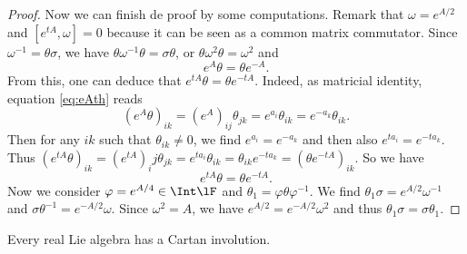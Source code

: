 \begin{proof}
	Now we can finish de proof by some computations. Remark that $\omega=e^{A/2}$ and $[e^{tA},\omega]=0$ because it can be seen as a common matrix commutator. Since $\omega^{-1}=\theta\sigma$, we have $\theta\omega^{-1}\theta=\sigma\theta$, or $\theta\omega^2\theta=\omega^2$ and
	\begin{equation}\label{eq:eAth}
		e^{A}\theta=\theta e^{-A}.
	\end{equation}
	From this, one can deduce that $e^{tA}\theta=\theta e^{-tA}$. Indeed, as matricial identity, equation \eqref{eq:eAth} reads
	\[
		(e^{A}\theta)_{ik}=(e^{A})_{ij}\theta_{jk}
		=e^{a_i}\theta_{ik}
		=e^{-a_k}\theta_{ik}.
	\]
	Then for any $ik$ such that $\theta_{ik}\neq 0$, we find $e^{a_i}=e^{-a_k}$ and then also $e^{ta_i}=e^{-ta_k}$. Thus $(e^{tA}\theta)_{ik}=(e^{tA})_ij\theta_{jk}=e^{ta_i}\theta_{ik}=\theta_{ik}e^{-ta_k}=(\theta e^{-tA})_{ik}$. So we have
	\begin{equation}
		e^{tA}\theta=\theta e^{-tA}.
	\end{equation}
	Now we consider $\varphi=e^{A/4}\in\Int\lF$ and $\theta_1=\varphi\theta\varphi^{-1}$. We find $\theta_1\sigma=e^{A/2}\omega^{-1}$ and $\sigma\theta^{-1}=e^{-A/2}\omega$. Since $\omega^2=A$, we have $e^{A/2}=e^{-A/2}\omega^2$ and thus $\theta_1\sigma=\sigma\theta_1$.

\end{proof}

\begin{corollary}
	Every real Lie algebra has a Cartan involution.
\end{corollary}

